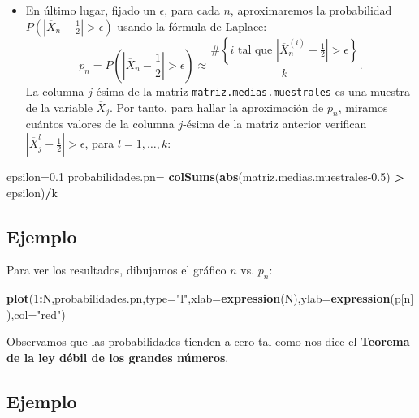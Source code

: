\documentclass[]{book}
\newenvironment{Shaded}{\begin{snugshade}}{\end{snugshade}}
\newcommand{\DataTypeTok}[1]{\textcolor[rgb]{0.13,0.29,0.53}{#1}}
\newcommand{\DecValTok}[1]{\textcolor[rgb]{0.00,0.00,0.81}{#1}}
\newcommand{\FloatTok}[1]{\textcolor[rgb]{0.00,0.00,0.81}{#1}}
\newcommand{\KeywordTok}[1]{\textcolor[rgb]{0.13,0.29,0.53}{\textbf{#1}}}
\newcommand{\NormalTok}[1]{#1}
\newcommand{\OperatorTok}[1]{\textcolor[rgb]{0.81,0.36,0.00}{\textbf{#1}}}
\newcommand{\StringTok}[1]{\textcolor[rgb]{0.31,0.60,0.02}{#1}}
\providecommand{\tightlist}{%
  \setlength{\itemsep}{0pt}\setlength{\parskip}{0pt}}
\begin{document}
\begin{itemize}
\tightlist
\item
  En último lugar, fijado un \(\epsilon\), para cada \(n\), aproximaremos la probabilidad \(P\left(\left|\overline{X}_n-\frac{1}{2}\right|>\epsilon\right)\) usando la fórmula de Laplace:
  \[
  p_n=P\left(\left|\overline{X}_n-\frac{1}{2}\right|>\epsilon\right) \approx\frac{\#\left\{\mbox{$i$ tal que  $\left|\overline{X}_n^{(i)}-\frac{1}{2}\right|>\epsilon$}\right\}}{k}.
  \]
  La columna \(j\)-ésima de la matriz \texttt{matriz.medias.muestrales} es una muestra de la variable \(\overline{X}_j\). Por tanto, para hallar la aproximación de \(p_n\), miramos cuántos valores de la columna \(j\)-ésima de la matriz anterior verifican \(\left|\overline{X}_j^{l}-\frac{1}{2}\right|>\epsilon\), para \(l=1,\ldots, k\):
\end{itemize}

\begin{Shaded}
\begin{Highlighting}[]
\NormalTok{epsilon=}\FloatTok{0.1}
\NormalTok{probabilidades.pn=}\StringTok{ }\KeywordTok{colSums}\NormalTok{(}\KeywordTok{abs}\NormalTok{(matriz.medias.muestrales}\FloatTok{-0.5}\NormalTok{) }\OperatorTok{>}\StringTok{ }\NormalTok{epsilon)}\OperatorTok{/}\NormalTok{k}
\end{Highlighting}
\end{Shaded}

\hypertarget{ejemplo-147}{%
\subsection{Ejemplo}\label{ejemplo-147}}

Para ver los resultados, dibujamos el gráfico \(n\) vs. \(p_n\):

\begin{Shaded}
\begin{Highlighting}[]
\KeywordTok{plot}\NormalTok{(}\DecValTok{1}\OperatorTok{:}\NormalTok{N,probabilidades.pn,}\DataTypeTok{type=}\StringTok{"l"}\NormalTok{,}\DataTypeTok{xlab=}\KeywordTok{expression}\NormalTok{(N),}\DataTypeTok{ylab=}\KeywordTok{expression}\NormalTok{(p[n]),}\DataTypeTok{col=}\StringTok{"red"}\NormalTok{)}
\end{Highlighting}
\end{Shaded}

Observamos que las probabilidades tienden a cero tal como nos dice el \textbf{Teorema de la ley débil de los grandes números}.

\hypertarget{ejemplo-148}{%
\subsection{Ejemplo}\label{ejemplo-148}}
\end{document}
